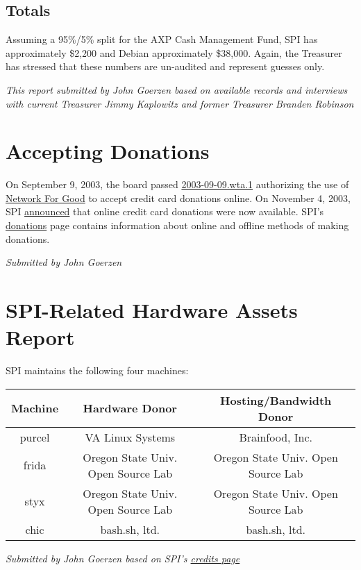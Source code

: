 \documentclass[letterpaper]{report}
\begin{document}
\subsection{Totals}

Assuming a 95\%/5\% split for the AXP Cash Management Fund, SPI has
approximately \$2,200 and Debian approximately \$38,000. Again, the
Treasurer has stressed that these numbers are un-audited and represent
guesses only.

\emph{This report submitted by John Goerzen based on available records
and interviews with current Treasurer Jimmy Kaplowitz and former Treasurer
Branden Robinson}


\section{Accepting Donations}

On September 9, 2003, the board passed \href{http://www.spi-inc.org/corporate/resolutions/2003/2003-09-09.wta.1}{2003-09-09.wta.1}
authorizing the use of \href{http://www.networkforgood.org/}{Network For Good}
to accept credit card donations online. On November 4, 2003, SPI \href{http://www.spi-inc.org/news/2003/20031104}{announced}
that online credit card donations were now available. SPI's \href{http://www.spi-inc.org/donations}{donations}
page contains information about online and offline methods of making
donations.

\emph{Submitted by John Goerzen}


\section{SPI-Related Hardware Assets Report}

SPI maintains the following four machines:

\begin{tabular}{|c|c|c|}
\hline
Machine & Hardware Donor & Hosting/Bandwidth Donor\tabularnewline
\hline
\hline
purcel & VA Linux Systems & Brainfood, Inc.\tabularnewline
\hline
frida & Oregon State Univ. Open Source Lab & Oregon State Univ. Open Source Lab\tabularnewline
\hline
styx & Oregon State Univ. Open Source Lab & Oregon State Univ. Open Source Lab\tabularnewline
\hline
chic & bash.sh, ltd. & bash.sh, ltd.\tabularnewline
\hline
\end{tabular}

\emph{Submitted by John Goerzen based on SPI's \href{http://www.spi-inc.org/credits}{credits page}}
\end{document}
